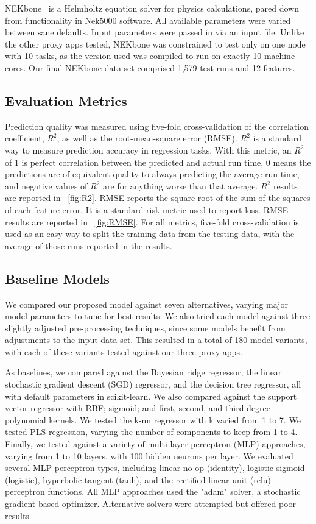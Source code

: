 \documentclass[conference, 10pt, onecolumn, draftclsnofoot]{IEEEtran}
\begin{document}
NEKbone~\cite{NEKbone} is a Helmholtz equation solver for physics calculations, pared down from functionality in Nek5000 software.
All available parameters were varied between sane defaults.
Input parameters were passed in via an input file.
Unlike the other proxy apps tested, NEKbone was constrained to test only on one node with 10 tasks, as the version used was compiled to run on exactly 10 machine cores.
Our final NEKbone data set comprised 1,579 test runs and 12 features.

\subsection{Evaluation Metrics}
Prediction quality was measured using five-fold cross-validation of the correlation coefficient, $R^2$, as well as the root-mean-square error (RMSE).
$R^2$ is a standard way to measure prediction accuracy in regression tasks.
With this metric, an $R^2$ of 1 is perfect correlation between the predicted and actual run time, 0 means the predictions are of equivalent quality to always predicting the average run time, and negative values of $R^2$ are for anything worse than that average.
$R^2$ results are reported in \figurename~\ref{fig:R2}.
RMSE reports the square root of the sum of the squares of each feature error.
It is a standard risk metric used to report loss.
RMSE results are reported in \figurename~\ref{fig:RMSE}.
For all metrics, five-fold cross-validation is used as an easy way to split the training data from the testing data, with the average of those runs reported in the results.

\subsection{Baseline Models}
We compared our proposed model against seven alternatives, varying major model parameters to tune for best results.
We also tried each model against three slightly adjusted pre-processing techniques, since some models benefit from adjustments to the input data set.
This resulted in a total of 180 model variants, with each of these variants tested against our three proxy apps.

As baselines, we compared against the Bayesian ridge regressor, the linear stochastic gradient descent (SGD) regressor, and the decision tree regressor, all with default parameters in scikit-learn.
We also compared against the support vector regressor with RBF; sigmoid; and first, second, and third degree polynomial kernels.
We tested the k-nn regressor with k varied from 1 to 7.
We tested PLS regression, varying the number of components to keep from 1 to 4.
Finally, we tested against a variety of multi-layer perceptron (MLP) approaches, varying from 1 to 10 layers, with 100 hidden neurons per layer.
We evaluated several MLP perceptron types, including linear no-op (identity), logistic sigmoid (logistic), hyperbolic tangent (tanh), and the rectified linear unit (relu) perceptron functions.
All MLP approaches used the "adam" solver, a stochastic gradient-based optimizer.
Alternative solvers were attempted but offered poor results.
\end{document}
